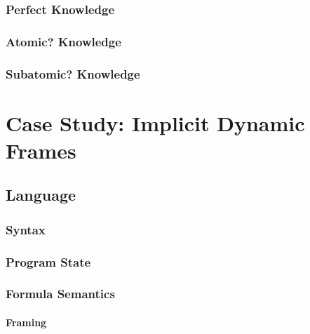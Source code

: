     
    \subsection{Perfect Knowledge}
    \label{ssec:perfect-knowledge}
    
    
    \subsection{Atomic? Knowledge}
    \label{ssec:atomic--knowledge}
    
    
    \subsection{Subatomic? Knowledge}
    \label{ssec:subatomic--knowledge}
    





\chapter{Case Study: Implicit Dynamic Frames}
\label{ch:case-study--implicit}


\section{Language}
\label{sec:language}


    \subsection{Syntax}
    \label{sec:syntax}
    
    
    \subsection{Program State}
    \label{ssec:program-state}
    
        
    \subsection{Formula Semantics}
    \label{ssec:formula-semantics}
    
    
        \subsubsection{Framing}
        \label{sssec:framing}
        
        
